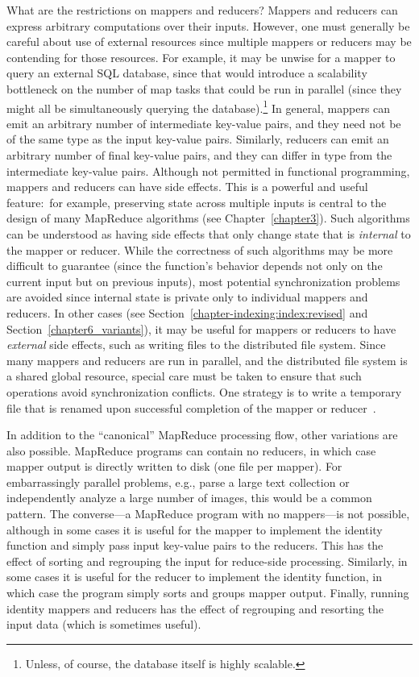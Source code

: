 \documentclass[11pt]{article}
\begin{document}
What are the restrictions on mappers and reducers?  Mappers and
reducers can express arbitrary computations over their inputs.
However, one must generally be careful about use of external resources
since multiple mappers or reducers may be contending for those
resources.  For example, it may be unwise for a mapper to query an
external SQL database, since that would introduce a scalability
bottleneck on the number of map tasks that could be run in parallel
(since they might all be simultaneously querying the
database).\footnote{Unless, of course, the database itself is highly
scalable.} In general, mappers can emit an arbitrary number of
intermediate key-value pairs, and they need not be of the same type as
the input key-value pairs.  Similarly, reducers can emit an arbitrary
number of final key-value pairs, and they can differ in type from the
intermediate key-value pairs.  Although not permitted in functional
programming, mappers and reducers can have side effects.  This is a
powerful and useful feature:\ for example, preserving state across
multiple inputs is central to the design of many MapReduce algorithms
(see Chapter~\ref{chapter3}).  Such algorithms can be understood as
having side effects that only change state that is \emph{internal} to
the mapper or reducer.  While the correctness of such algorithms may
be more difficult to guarantee (since the function's behavior depends
not only on the current input but on previous inputs), most potential
synchronization problems are avoided since internal state is private
only to individual mappers and reducers.  In other cases (see
Section~\ref{chapter-indexing:index:revised} and
Section~\ref{chapter6_variants}), it may be useful for mappers or
reducers to have \emph{external} side effects, such as writing files
to the distributed file system.  Since many mappers and reducers are
run in parallel, and the distributed file system is a shared global
resource, special care must be taken to ensure that such operations
avoid synchronization conflicts.  One strategy is to write a temporary
file that is renamed upon successful completion of the mapper or
reducer~\cite{Dean_Ghemawat_OSDI2004}.

In addition to the ``canonical'' MapReduce processing flow, other
variations are also possible.  MapReduce programs can contain no
reducers, in which case mapper output is directly written to disk (one
file per mapper).  For embarrassingly parallel problems, e.g., parse a
large text collection or independently analyze a large number of
images, this would be a common pattern.  The converse---a MapReduce
program with no mappers---is not possible, although in some cases it
is useful for the mapper to implement the identity function and simply
pass input key-value pairs to the reducers.  This has the effect of
sorting and regrouping the input for reduce-side processing.
Similarly, in some cases it is useful for the reducer to implement the
identity function, in which case the program simply sorts and groups
mapper output.  Finally, running identity mappers and reducers has the
effect of regrouping and resorting the input data (which is sometimes
useful).
\end{document}
